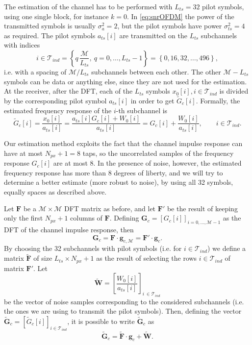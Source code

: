 \documentclass[10pt]{article}
\newcommand{\ofdM} {\mathcal{M}}
\newcommand{\DFTmat} {\mathbf{F}}
\newcommand{\DFTreduced} {\mathbf{\tilde{F}}}
\begin{document}
The estimation of the channel has to be performed with $L_{ts} = 32$ pilot symbols, using one single block, for instance $k=0$. In \eqref{eq:snrOFDM} the power of the transmitted symbols is usually $\sigma_a^2 = 2$, but the pilot symbols have power $\sigma_{ts}^2 = 4$ as required. The pilot symbols $a_{ts}[i]$ are transmitted on the $L_{ts}$ subchannels with indices
\begin{equation}
	i \in \mathcal{T}_{ind} = \left\{q \, \frac{\ofdM}{L_{ts}}, \ q = 0,\ldots,L_{ts}-1 \right\}  = \left\{ 0, 16, 32, \dots, 496 \right\},
	\label{eq:OFDMequallyspacedindices}
\end{equation}
i.e. with a spacing of $\ofdM/L_{ts}$ subchannels between each other. The other $\ofdM - L_{ts}$ symbols can be data or anything else, since they are not used for the estimation. At the receiver, after the DFT, each of the $L_{ts}$ symbols $x_0[i], i \in \mathcal{T}_{ind}$ is divided by the corresponding pilot symbol $a_{ts}[i]$ in order to get $\tilde{G}_c[i]$. Formally, the estimated frequency response of the $i$-th subchannel is
\begin{equation}
	\tilde{G}_c[i] = \dfrac{x_0[i]}{a_{ts}[i]} = \dfrac{a_{ts}[i] G_c[i] + W_0[i]}{a_{ts}[i]} = G_c[i] + \dfrac{W_0[i]}{a_{ts}[i]}, \qquad i \in \mathcal{T}_{ind}.
\end{equation}

Our estimation method exploits the fact that the channel impulse response can have at most $N_{px} + 1 = 8$ taps, so the uncorrelated samples of the frequency response $G_c[i]$ are at most 8. In the presence of noise, however, the estimated frequency response has more than 8 degrees of liberty, and we will try to determine a better estimate (more robust to noise), by using all 32 symbols, equally spaces as described above.

Let $\DFTmat$ be a $\ofdM \times \ofdM$ DFT matrix as before, and let $\DFTmat'$ be the result of keeping only the first $N_{px}+1$ columns of $\DFTmat$. Defining $\mathbf{G}_c = [ G_c[i] ]_{i = 0,\ldots,\ofdM-1}$ as the DFT of the channel impulse response, then
\begin{equation}
	\mathbf{G}_c = \DFTmat \cdot \mathbf{g}_{c,\ofdM} = \DFTmat' \cdot \mathbf{g}_c.
\end{equation}
By choosing the 32 subchannels with pilot symbols (i.e. for $ i \in \mathcal{T}_{ind}$) we define a matrix $\DFTreduced$ of size $L_{ts} \times N_{px} + 1$ as the result of selecting the rows $ i\in \mathcal{T}_{ind} $ of matrix $\DFTmat'$. Let 
\begin{equation}
\mathbf{\tilde{W}} = \left[ \dfrac{W_0[i]}{a_{ts}[i]} \right] _{i\ \in \mathcal{T}_{ind}}
\end{equation}
be the vector of noise samples corresponding to the considered subchannels (i.e. the ones we are using to transmit the pilot symbols). Then, defining the vector $\tilde{\mathbf{G}}_c = [ \tilde{G}_c[i] ]_{i\in \mathcal{T}_{ind}}$, it is possible to write $\mathbf{\tilde{G}}_c$ as
\begin{equation}
	\mathbf{\tilde{G}}_c = \DFTreduced \cdot \mathbf{g}_{c} + \mathbf{\tilde{W}}.
	\label{eq:OFDMfreqresp}
\end{equation}
\end{document}
